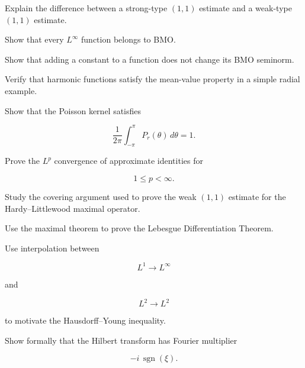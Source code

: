 \begin{exercise}[2]
Explain the difference between a strong-type \((1,1)\) estimate and a
weak-type \((1,1)\) estimate.
\end{exercise}

\begin{exercise}[2]
Show that every \(L^\infty\) function belongs to BMO.
\end{exercise}

\begin{exercise}[2]
Show that adding a constant to a function does not change its BMO
seminorm.
\end{exercise}

\begin{exercise}[2]
Verify that harmonic functions satisfy the mean-value property in a
simple radial example.
\end{exercise}

\begin{exercise}[2]
Show that the Poisson kernel satisfies

\[
\frac{1}{2\pi}
\int_{-\pi}^{\pi}
P_r(\theta)\,d\theta=1.
\]
\end{exercise}

\begin{exercise}[3]
Prove the \(L^p\) convergence of approximate identities for

\[
1\leq p<\infty.
\]
\end{exercise}

\begin{exercise}[3]
Study the covering argument used to prove the weak \((1,1)\) estimate for
the Hardy--Littlewood maximal operator.
\end{exercise}

\begin{exercise}[3]
Use the maximal theorem to prove the Lebesgue Differentiation Theorem.
\end{exercise}

\begin{exercise}[3]
Use interpolation between

\[
L^1\to L^\infty
\]

and

\[
L^2\to L^2
\]

to motivate the Hausdorff--Young inequality.
\end{exercise}

\begin{exercise}[3]
Show formally that the Hilbert transform has Fourier multiplier

\[
-i\,\operatorname{sgn}(\xi).
\]
\end{exercise}


